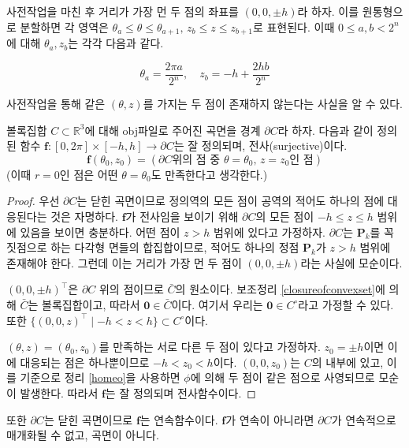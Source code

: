 \documentclass{Humantech_Paper_Awardfullpaper_hutech}
\begin{document}
사전작업을 마친 후 거리가 가장 먼 두 점의 좌표를 $(0, 0, \pm h)$라 하자. 이를 원통형으로 분할하면 각 영역은 $\theta_a \leq \theta \leq \theta_{a+1}, \, z_b \leq z \leq z_{b+1}$로 표현된다. 이때 $0 \leq a, b < 2^n$에 대해 $\theta_a, z_b$는 각각 다음과 같다. 

$$ \theta_a = \frac{2\pi a}{2^n}, \quad z_b = -h + \frac{2hb}{2^n} $$

사전작업을 통해 같은 $(\theta, z)$를 가지는 두 점이 존재하지 않는다는 사실을 알 수 있다. 

\begin{thm} \label{proj}
	볼록집합 $C \subset \mathbb{R}^3$에 대해 obj파일로 주어진 곡면을 경계 $\partial C$라 하자. 다음과 같이 정의된 함수 $\mathbf{f} \colon [0, 2\pi] \times [-h, h] \to \partial C$는 잘 정의되며, 전사(surjective)이다. 
	$$ \mathbf{f}(\theta_0, z_0) = (\partial C \text{위의 점 중 } \theta = \theta_0, \, z = z_0 \text{인 점}) $$
	(이때 $r=0$인 점은 어떤 $\theta = \theta_0$도 만족한다고 생각한다.)
\end{thm}
\begin{proof}
	우선 $\partial C$는 닫힌 곡면이므로 정의역의 모든 점이 공역의 적어도 하나의 점에 대응된다는 것은 자명하다. $\mathbf{f}$가 전사임을 보이기 위해 $\partial C$의 모든 점이 $-h \leq z \leq h$ 범위에 있음을 보이면 충분하다. 어떤 점이 $z > h$ 범위에 있다고 가정하자. $\partial C$는 $\mathbf{P}_k$를 꼭짓점으로 하는 다각형 면들의 합집합이므로, 적어도 하나의 정점 $\mathbf{P}_k$가 $z > h$ 범위에 존재해야 한다. 그런데 이는 거리가 가장 먼 두 점이 $(0, 0, \pm h)$라는 사실에 모순이다. 
	
	$(0, 0, \pm h)^\intercal$은 $\partial C$ 위의 점이므로 $\bar{C}$의 원소이다. 보조정리 \ref{closureofconvexset}에 의해 $\bar{C}$는 볼록집합이고, 따라서 $\mathbf{0} \in \bar{C}$이다. 여기서 우리는 $\mathbf{0} \in C^\circ$라고 가정할 수 있다. 또한 $\{ (0, 0, z)^\intercal \mid -h < z < h \} \subset C^\circ$이다. 
	
	$(\theta, z) = (\theta_0, z_0)$를 만족하는 서로 다른 두 점이 있다고 가정하자. $z_0 = \pm h$이면 이에 대응되는 점은 하나뿐이므로 $-h < z_0 < h$이다. $(0, 0, z_0)$는 $C$의 내부에 있고, 이를 기준으로 정리 \ref{homeo}을 사용하면 $\phi$에 의해 두 점이 같은 점으로 사영되므로 모순이 발생한다. 따라서 $\mathbf{f}$는 잘 정의되며 전사함수이다. 
\end{proof}

또한 $\partial C$는 닫힌 곡면이므로 $\mathbf{f}$는 연속함수이다. $\mathbf{f}$가 연속이 아니라면 $\partial C$가 연속적으로 매개화될 수 없고, 곡면이 아니다. 
\end{document}
